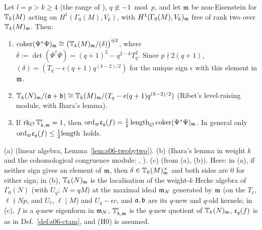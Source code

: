\begin{proposition}\label{prop:s06-betti}
Let $l=p>k\ge4$ (the range of ), $q\not\equiv-1\bmod p$, and let $\mathfrak{m}$ be non-Eisenstein for $\mathbb{T}_k(M)$ acting on
$H^1(\Gamma_0(M),V_k)$, with $H^1(\Gamma_0(M),V_k)_{\mathfrak{m}}$ free of rank two over $\mathbb{T}_k(M)_{\mathfrak{m}}$. Then:
\begin{enumerate}[label=(\alph*)]
\item $\operatorname{coker}(\Psi^*\Psi)_{\mathfrak{m}}\cong\big(\mathbb{T}_k(M)_{\mathfrak{m}}/(\delta)\big)^{\oplus2}$, where $\delta:=\det(\Psi^*\Psi)=(q+1)^2-q^{2-k}T_q^2$.
  Since $p\nmid2(q+1)$, $(\delta)=(T_q-\epsilon(q+1)q^{(k-2)/2})$ for the unique sign $\epsilon$ with this element in $\mathfrak{m}$.
\item $\mathbb{T}_k(N)_{\mathfrak{m}}/(\mathfrak{a}+\mathfrak{b})\cong\mathbb{T}_k(M)_{\mathfrak{m}}/(T_q-\epsilon(q+1)q^{(k-2)/2})$ (Ribet's level-raising module, with Ihara's lemma).
\item If $\operatorname{rk}_{\mathcal{O}}\mathbb{T}'_{k,\mathfrak{m}}=1$, then $\mathrm{ord}_\varpi\mathfrak{c}_q(f)=\tfrac12\,\mathrm{length}_{\mathcal{O}}\operatorname{coker}(\Psi^*\Psi)_{\mathfrak{m}}$. In general only
  $\mathrm{ord}_\varpi\mathfrak{c}_q(f)\le\tfrac12\mathrm{length}$ holds.
\end{enumerate}
(a) \stproved{} (linear algebra, Lemma~\ref{lem:s06-twobytwo}). (b) \stpmc{} (Ihara's lemma in weight $k$ and the cohomological
congruence module: \cite[Lemma~3.2 and \S2]{Dia91}, \cite[\S3]{Dia89}). (c) \stpmc{} (from (a), (b)).
Here: in (a), if neither sign gives an element of $\mathfrak{m}$, then $\delta\in\mathbb{T}_k(M)_{\mathfrak{m}}^\times$ and both sides are $0$ for either sign;
in (b), $\mathbb{T}_k(N)_{\mathfrak{m}}$ is the localisation of the weight-$k$ Hecke algebra of $\Gamma_0(N)$ (with $U_q$; $N=qM$) at the maximal ideal $\mathfrak{m}_N$
generated by $\mathfrak{m}$ (on the $T_\ell$, $\ell\nmid Np$, and $U_\ell$, $\ell\mid M$) and $U_q-\epsilon c$, and $\mathfrak{a},\mathfrak{b}$ are its $q$-new and
$q$-old kernels; in (c), $f$ is a $q$-new eigenform in $\mathfrak{m}_N$, $\mathbb{T}'_{k,\mathfrak{m}}$ is the $q$-new quotient of $\mathbb{T}_k(N)_{\mathfrak{m}}$, $\mathfrak{c}_q(f)$ is as in
Def.~\ref{def:s06-ctam}, and (H0) is assumed. 
\end{proposition}

